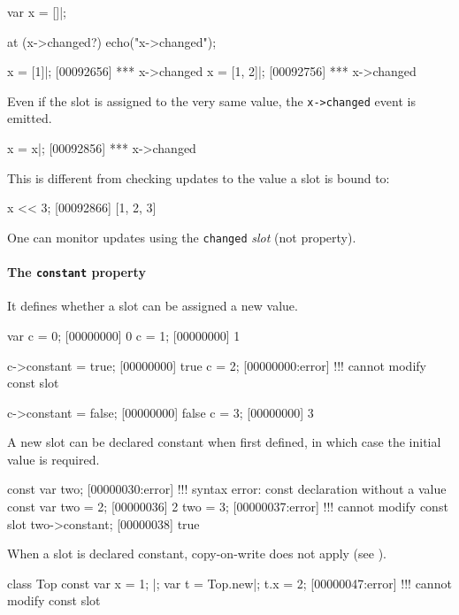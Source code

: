 \begin{urbiscript}[firstnumber=1]
var x = []|;

at (x->changed?)
  echo("x->changed");

x = [1]|;
[00092656] *** x->changed
x = [1, 2]|;
[00092756] *** x->changed
\end{urbiscript}

Even if the slot is assigned to the very same value, the
\lstinline|x->changed| event is emitted.

\begin{urbiscript}
x = x|;
[00092856] *** x->changed
\end{urbiscript}

This is different from checking updates to the value a slot is bound to:

\begin{urbiscript}
x << 3;
[00092866] [1, 2, 3]
\end{urbiscript}

One can monitor updates using the \lstinline|changed| \emph{slot} (not
property).


\paragraph{The \lstinline|constant| property}
It defines whether a slot can be assigned a new value.

\begin{urbiscript}
var c = 0;
[00000000] 0
c = 1;
[00000000] 1

c->constant = true;
[00000000] true
c = 2;
[00000000:error] !!! cannot modify const slot

c->constant = false;
[00000000] false
c = 3;
[00000000] 3
\end{urbiscript}

A new slot can be declared constant when first defined, in which case the
initial value is required.

\begin{urbiscript}
const var two;
[00000030:error] !!! syntax error: const declaration without a value
const var two = 2;
[00000036] 2
two = 3;
[00000037:error] !!! cannot modify const slot
two->constant;
[00000038] true
\end{urbiscript}

When a slot is declared constant, copy-on-write does not apply (see
).

\begin{urbiscript}
class Top
{
  const var x = 1;
}|;
var t = Top.new|;
t.x = 2;
[00000047:error] !!! cannot modify const slot
\end{urbiscript}



